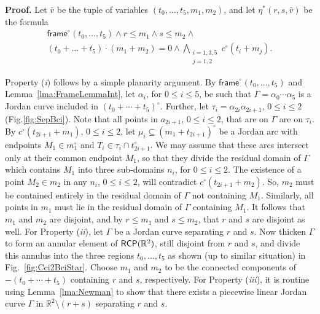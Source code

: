 \documentclass{article}
\newcommand{\ic}{c^\circ}
\newcommand{\R}{\mathbb{R}}
\newcommand{\RCP}{{\sf RCP}}
\newcommand{\ti}[2][]{{#2}^{\circ_{#1}}}
\newcommand{\frameFlai}{\ti{\mathsf{frame}}}
\newcommand{\qedsymbol}{\ding{113}}
\newenvironment{proof}{\par\noindent\textbf{Proof.}}{\mbox{}\hfill\qedsymbol\par\bigskip}
\begin{document}
\begin{proof}
	Let $\bar{v}$ be the tuple of variables $(t_0,\ldots,t_5, m_1, m_2)$, and let
	$\eta^*(r,s,\bar{v})$ be the formula
	\begin{multline*}
			\frameFlai(t_0,\ldots,t_5)\land  r\leq m_1 \wedge s\leq m_2 \wedge \\
		  (t_0 + \ldots + t_5) \cdot (m_1 +m_2) = 0  \wedge \bigwedge_{\substack{i=1,3,5\\j=1,2}} \ic(t_i + m_j).
	\end{multline*}
	
	Property ({\em i}) follows by a simple planarity argument. By
	$\frameFlai(t_0,\ldots,t_5)$ and Lemma~\ref{lma:FrameLemmaInt}, 
	let $\alpha_i$, for $0\leq i\leq 5$, be such that 
	$\Gamma=\alpha_0\cdots\alpha_5$ is a Jordan curve included in 
	$\ti{(t_0 + \cdots + t_5)}$. Further, let 
	$\tau_i=\alpha_{2i}\alpha_{2i+1}$, $0\leq i\leq 2$ 
	(Fig.\ref{fig:SepBci}). Note that all points in $a_{2i+1}$,
	$0\leq i\leq 2$, that are on $\Gamma$ are on $\tau_i$. By 
	$\ic(t_{2i+1} + m_1)$, $0\leq i\leq 2$, let 
	$\mu_i\subseteq(m_1+t_{2i+1})^\circ$ be a Jordan arc with 
	endpoints $M_1\in m_1^\circ$ and $T_i\in\tau_i\cap t_{2i+1}^\circ$. 
	We may assume that these arcs intersect only at their common 
	endpoint $M_1$, so that they divide the residual domain of 
	$\Gamma$ which contains $M_1$ into three sub-domains $n_i$, for 
	$0\leq i\leq 2$. The existence of a point $M_2\in m_2$ in any 
	$n_i$, $0\leq i\leq 2$, will contradict $\ic(t_{2i+1} + m_2)$. 
	So, $m_2$ must be contained entirely in the residual domain of 
	$\Gamma$ not containing $M_1$. Similarly, all points in $m_1$ must 
	lie in the residual domain of $\Gamma$ containing $M_1$. It follows 
	that $m_1$ and $m_2$ are disjoint, and by $r\leq m_1$ and 
	$s\leq m_2$, that $r$ and $s$ are disjoint as well.
	For Property ({\em ii}), let $\Gamma$ be a Jordan curve
	separating $r$ and $s$. Now thicken $\Gamma$ to form an annular
	element of $\RCP(\R^2)$, still disjoint from $r$ and $s$, and divide
	this annulus into the three regions $t_0,\ldots,t_5$ as shown
	(up to similar situation) in Fig.~\ref{fig:Cci2BciStar}.
	Choose $m_1$ and $m_2$ to be the connected components
	of $-(t_0+\cdots+t_5)$ containing $r$ and $s$, respectively.	
	For Property ({\em iii}), it is routine using Lemma~\ref{lma:Newman} 
	to show that there exists a piecewise linear Jordan curve
	$\Gamma$  in $\R^2 \setminus(r+s)$ separating $r$ and $s$.
\end{proof}
\end{document}
